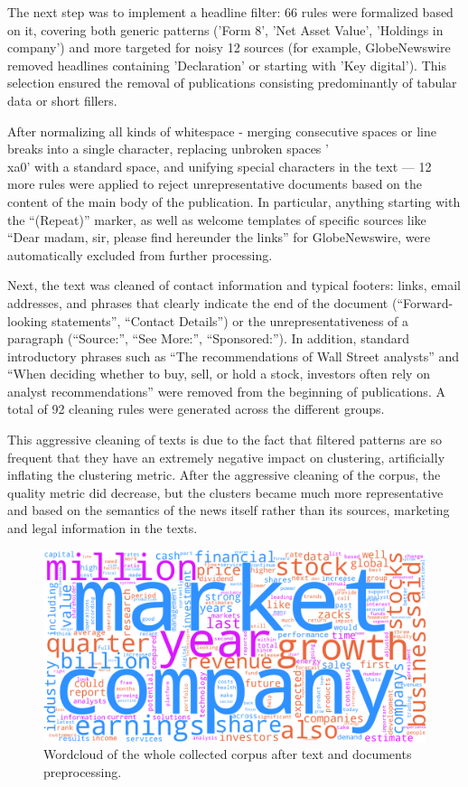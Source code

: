 The next step was to implement a headline filter: 66 rules were formalized based on it, covering both generic patterns ('Form 8',
'Net Asset Value', 'Holdings in company') and more targeted for noisy 12 sources (for example, GlobeNewswire removed headlines
containing 'Declaration' or starting with 'Key digital'). This selection ensured the removal of publications consisting
predominantly of tabular data or short fillers.

After normalizing all kinds of whitespace - merging consecutive spaces or line breaks into a single character, replacing unbroken
spaces '\\xa0' with a standard space, and unifying special characters in the text — 12 more rules were applied to reject
unrepresentative documents based on the content of the main body of the publication. In particular, anything starting with
the “(Repeat)” marker, as well as welcome templates of specific sources like “Dear madam, sir, please find hereunder the links”
for GlobeNewswire, were automatically excluded from further processing.

Next, the text was cleaned of contact information and typical footers: links, email addresses, and phrases that clearly indicate
the end of the document (“Forward-looking statements”, “Contact Details”) or the unrepresentativeness of a paragraph (“Source:”,
“See More:”, “Sponsored:”). In addition, standard introductory phrases such as “The recommendations of Wall Street analysts” and
“When deciding whether to buy, sell, or hold a stock, investors often rely on analyst recommendations” were removed from
the beginning of publications. A total of 92 cleaning rules were generated across the different groups.

This aggressive cleaning of texts is due to the fact that filtered patterns are so frequent that they have an extremely negative
impact on clustering, artificially inflating the clustering metric. After the aggressive cleaning of the corpus, the quality metric
did decrease, but the clusters became much more representative and based on the semantics of the news itself rather than its
sources, marketing and legal information in the texts.

\begin{figure}[H]
    \centering
    \includegraphics[width=1\linewidth]{img/prep_wordcloud.png}
    \caption{\label{fig:prep_wordcloud} Wordcloud of the whole collected corpus after text and documents preprocessing.}
\end{figure}

